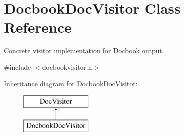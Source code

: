 \hypertarget{class_docbook_doc_visitor}{}\section{Docbook\+Doc\+Visitor Class Reference}
\label{class_docbook_doc_visitor}


Concrete visitor implementation for Docbook output.  




{\ttfamily \#include $<$docbookvisitor.\+h$>$}

Inheritance diagram for Docbook\+Doc\+Visitor\+:\begin{figure}[H]
\begin{center}
\leavevmode
\includegraphics[height=2.000000cm]{class_docbook_doc_visitor}
\end{center}
\end{figure}
